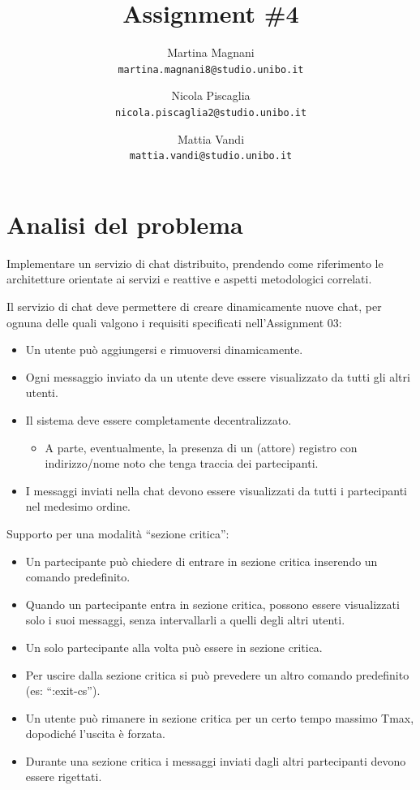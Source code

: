 \documentclass[a4paper]{article}
\title{\Huge \bf
Assignment \#4
}
\author{
    Martina Magnani\\
    \texttt{martina.magnani8@studio.unibo.it}
    \and
    Nicola Piscaglia\\
    \texttt{nicola.piscaglia2@studio.unibo.it}
    \and
    Mattia Vandi\\
    \texttt{mattia.vandi@studio.unibo.it}
}
\date{}
\begin{document}
\maketitle


\section{Analisi del problema}\label{analisi-del-problema-1}
Implementare un servizio di chat distribuito, prendendo come riferimento le architetture orientate ai servizi e reattive e aspetti metodologici correlati.

Il servizio di chat deve permettere di creare dinamicamente nuove chat, per ognuna delle quali valgono i requisiti specificati nell'Assignment 03:
\begin{itemize}
    \item Un utente può aggiungersi e rimuoversi dinamicamente.
    \item Ogni messaggio inviato da un utente deve essere visualizzato da tutti gli altri utenti.
    \item Il sistema deve essere completamente decentralizzato.
        \begin{itemize}
            \item A parte, eventualmente, la presenza di un (attore) registro con indirizzo/nome noto che tenga traccia dei partecipanti.
        \end{itemize}
    \item I messaggi inviati nella chat devono essere visualizzati da tutti i partecipanti nel medesimo ordine.
\end{itemize}
Supporto per una modalità “sezione critica”:
\begin{itemize}
    \item Un partecipante può chiedere di entrare in sezione critica inserendo un comando predefinito.
    \item Quando un partecipante entra in sezione critica, possono essere visualizzati solo i suoi messaggi, senza intervallarli a quelli degli altri utenti.
    \item Un solo partecipante alla volta può essere in sezione critica.
    \item Per uscire dalla sezione critica si può prevedere un altro comando predefinito (es: “:exit-cs”).
    \item Un utente può rimanere in sezione critica per un certo tempo massimo Tmax, dopodiché l'uscita è forzata.
    \item Durante una sezione critica i messaggi inviati dagli altri partecipanti devono essere rigettati.
\end{itemize}
\end{document}
